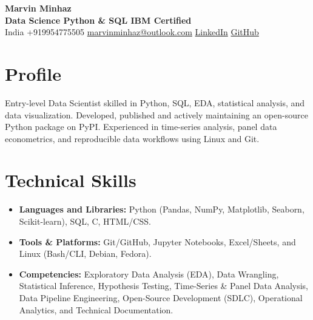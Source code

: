 \documentclass[10pt, a4paper]{article}
\begin{document}
	\pagestyle{empty}
	
	\begin{center}
		{\Huge \textbf{Marvin Minhaz}}\\[0.5em]
		\textbf{Data Science \textbar \space Python \& SQL \textbar \space IBM Certified}\\[0.2em]
		India \textbar\space +919954775505 \textbar\space \href{mailto:marvinminhaz@outlook.com}{marvinminhaz@outlook.com} \textbar\space \href{https://linkedin.com/in/marvinminhaz}{LinkedIn} \textbar\space \href{https://github.com/marvinminhaz}{GitHub}
	\end{center}
	
	
	
	\section{Profile}
	\noindent Entry-level Data Scientist skilled in Python, SQL, EDA, statistical analysis, and data visualization. Developed, published and actively maintaining an open-source Python package on PyPI. Experienced in time-series analysis, panel data econometrics, and reproducible data workflows using Linux and Git.
	
	
	
	\section{Technical Skills}
	\begin{itemize}[leftmargin=0in, label={}]
		\item \textbf{Languages and Libraries:} Python (Pandas, NumPy, Matplotlib, Seaborn, Scikit-learn), SQL, C, HTML/CSS.
		\item \textbf{Tools \& Platforms:} Git/GitHub, Jupyter Notebooks, Excel/Sheets, and Linux (Bash/CLI, Debian, Fedora).
		
		\item \textbf{Competencies:} Exploratory Data Analysis (EDA), Data Wrangling, Statistical Inference, Hypothesis Testing, Time-Series \& Panel Data Analysis, Data Pipeline Engineering, Open-Source Development (SDLC), Operational Analytics, and Technical Documentation.
	
	\end{itemize}
	
	
	
\end{document}
